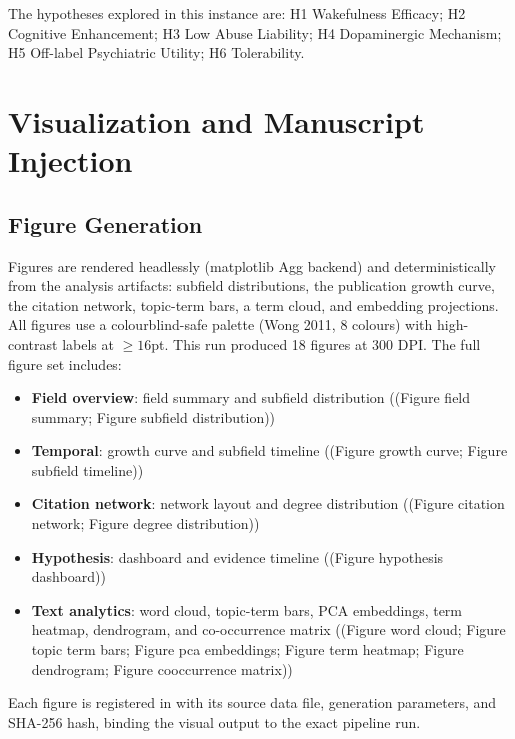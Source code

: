 \documentclass[
  english,
]{article}
\providecommand{\tightlist}{%
  \setlength{\itemsep}{0pt}\setlength{\parskip}{0pt}}
\begin{document}
The hypotheses explored in this instance are: H1 Wakefulness Efficacy;
H2 Cognitive Enhancement; H3 Low Abuse Liability; H4 Dopaminergic
Mechanism; H5 Off-label Psychiatric Utility; H6 Tolerability.

\newpage

\section{Visualization and Manuscript
Injection}\label{visualization-and-manuscript-injection}

\subsection{Figure Generation}\label{figure-generation}

Figures are rendered headlessly (matplotlib Agg backend) and
deterministically from the analysis artifacts: subfield distributions,
the publication growth curve, the citation network, topic-term bars, a
term cloud, and embedding projections. All figures use a
colourblind-safe palette (Wong 2011, 8 colours) with high-contrast
labels at \(\geq 16\)pt. This run produced 18 figures at 300 DPI. The
full figure set includes:

\begin{itemize}
\tightlist
\item
  \textbf{Field overview}: field summary and subfield distribution
  ((Figure field summary; Figure subfield distribution))
\item
  \textbf{Temporal}: growth curve and subfield timeline ((Figure growth
  curve; Figure subfield timeline))
\item
  \textbf{Citation network}: network layout and degree distribution
  ((Figure citation network; Figure degree distribution))
\item
  \textbf{Hypothesis}: dashboard and evidence timeline ((Figure
  hypothesis dashboard))
\item
  \textbf{Text analytics}: word cloud, topic-term bars, PCA embeddings,
  term heatmap, dendrogram, and co-occurrence matrix ((Figure word
  cloud; Figure topic term bars; Figure pca embeddings; Figure term
  heatmap; Figure dendrogram; Figure cooccurrence matrix))
\end{itemize}

Each figure is registered in  with its
source data file, generation parameters, and SHA-256 hash, binding the
visual output to the exact pipeline run.
\end{document}

